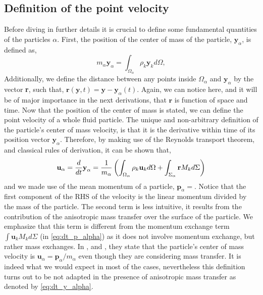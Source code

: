 \subsection{Definition of the point velocity}
Before diving in further details it is crucial to define some fundamental quantities of the particles $\alpha$.
First, the position of the center of mass of the particle, $\textbf{y}_\alpha$, is defined as,
\begin{equation*}
    m_\alpha \textbf{y}_\alpha
    = \int_{\Omega_\alpha} \rho_k \textbf{y}_k d\Omega,
\end{equation*}
Additionally, we define the distance between any points inside $\Omega_\alpha$ and $\textbf{y}_\alpha$ by the vector \textbf{r}, such that, $\textbf{r}(\textbf{y},t) = \textbf{y} - \textbf{y}_\alpha(t)$.
Again, we can notice here, and it will be of major importance in the next derivations, that $\textbf{r}$ is function of space and time.
Now that the position of the center of mass is stated, we can define the point velocity of a whole fluid particle.
The unique and non-arbitrary definition of the particle's center of mass velocity, is that it is the derivative within time of its position vector $\textbf{y}_\alpha$.
Therefore, by making use of the Reynolds transport theorem, and classical rules of derivation, it can be shown that,
\begin{equation}
    \textbf{u}_\alpha = \frac{d}{d t} \textbf{y}_\alpha
    = \frac{1}{m_\alpha} \left(
        \int_{\Omega_\alpha} \rho_k \textbf{u}_k d\Omega
        +  \int_{\Sigma_\alpha} \textbf{r} M_k d\Sigma
        \right)
        \label{eq:dt_y_alpha}
\end{equation}
and we made use of the mean momentum of a particle, $\textbf{p}_\alpha = $.
Notice that the first component of the RHS of the velocity is the linear momentum divided by the mass of the particle.
The second term is less intuitive, it results from the contribution of the anisotropic mass transfer over the surface of the particle.
We emphasize that this term is different from the momentum exchange term $\int \textbf{u}_kM_k d\Sigma$ (in \ref{eq:dt_p_alpha}) as it does not involve momentum exchange, but rather mass exchanges.
In \citet{zaepffel2011modelisation}, \citet{paisant2014modelisation} and \citet{morel2015mathematical}, they state that the particle's center of mass velocity is $\textbf{u}_\alpha = \textbf{p}_\alpha / m_\alpha$ even though they are considering mass transfer.
It is indeed what we would expect in most of the cases, nevertheless this definition turns out to be not adapted in the presence of anisotropic mass transfer as denoted by \ref{eq:dt_y_alpha}.
